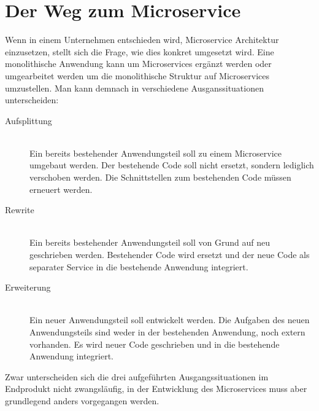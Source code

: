 \section{Der Weg zum Microservice}
Wenn in einem Unternehmen entschieden wird, Microservice Architektur einzusetzen, stellt sich die Frage, wie dies konkret umgesetzt wird. Eine monolithische Anwendung kann um Microservices ergänzt werden oder umgearbeitet werden um die monolithische Struktur auf Microservices umzustellen.
Man kann demnach in verschiedene Ausganssituationen unterscheiden:
\begin{description}
  \item[Aufsplittung] \hfill \\
  Ein bereits bestehender Anwendungsteil soll zu einem Microservice umgebaut werden. Der bestehende Code soll nicht ersetzt, sondern lediglich verschoben werden. Die Schnittstellen zum bestehenden Code müssen erneuert werden.
  \item[Rewrite] \hfill \\
  Ein bereits bestehender Anwendungsteil soll von Grund auf neu geschrieben werden. Bestehender Code wird ersetzt und der neue Code als separater Service in die bestehende Anwendung integriert.
  \item[Erweiterung] \hfill \\
  Ein neuer Anwendungsteil soll entwickelt werden. Die Aufgaben des neuen Anwendungsteils sind weder in der bestehenden Anwendung, noch extern vorhanden. Es wird neuer Code geschrieben und in die bestehende Anwendung integriert.
\end{description}
Zwar unterscheiden sich die drei aufgeführten Ausgangssituationen im Endprodukt nicht zwangsläufig, in der Entwicklung des Microservices muss aber grundlegend anders vorgegangen werden. 


